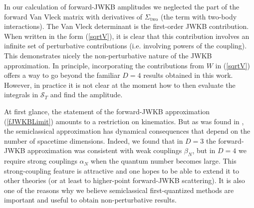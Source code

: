 In our calculation of forward-JWKB amplitudes we neglected the part of the forward Van Vleck matrix with derivatives of $\Sigma_{\text{two}}$ (the term with two-body interactions). The Van Vleck determinant is the first-order JWKB contribution. When written in the form (\ref{sqrtV}), it is clear that this contribution involves an infinite set of perturbative contributions (i.e. involving powers of the coupling). This demonstrates nicely the non-perturbative nature of the JWKB approximation. In principle, incorporating the contributions from $W$ in (\ref{sqrtV}) offers a way to go beyond the familiar $D = 4$ results obtained in this work. However, in practice it is not clear at the moment how to then evaluate the integrals in $\mathcal{S}_{T}$ and find the amplitude.

At first glance, the statement of the forward-JWKB approximation (\ref{fJWKBLimit}) amounts to a restriction on kinematics. But as was found in \cite{HalpernSiegel}, the semiclassical approximation has dynamical consequences that depend on the number of spacetime dimensions. Indeed, we found that in $D = 3$ the forward-JWKB approximation was consistent with weak couplings $\beta_{N}$, but in $D = 4$ we require strong couplings $\alpha_{N}$ when the quantum number becomes large. This strong-coupling feature is attractive and one hopes to be able to extend it to other theories (or at least to higher-point forward-JWKB scattering). It is also one of the reasons why we believe semiclassical first-quantized methods are important and useful to obtain non-perturbative results.